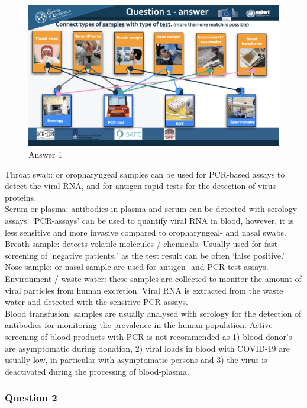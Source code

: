 \documentclass[
]{book}
\begin{document}
\begin{figure}
\centering
\includegraphics{images/m02/m02_questions_v2.003.jpeg}
\caption{Answer 1}
\end{figure}

Throat swab: or oropharyngeal samples can be used for PCR-based assays to detect the viral RNA, and for antigen rapid tests for the detection of virus-proteins.\\
Serum or plasma: antibodies in plasma and serum can be detected with serology assays. `PCR-assays' can be used to quantify viral RNA in blood, however, it is less sensitive and more invasive compared to oropharyngeal- and nasal swabs.\\
Breath sample: detects volatile molecules / chemicals. Usually used for fast screening of `negative patients,' as the test result can be often `false positive.'\\
Nose sample: or nasal sample are used for antigen- and PCR-test assays.\\
Environment / waste water: these samples are collected to monitor the amount of viral particles from human excretion. Viral RNA is extracted from the waste water and detected with the sensitive PCR-assays.\\
Blood transfusion: samples are usually analysed with serology for the detection of antibodies for monitoring the prevalence in the human population. Active screening of blood products with PCR is not recommended as 1) blood donor's are asymptomatic during donation, 2) viral loads in blood with COVID-19 are usually low, in particular with asymptomatic persons and 3) the virus is deactivated during the processing of blood-plasma.

\hypertarget{question-2}{%
\subsubsection{Question 2}\label{question-2}}
\end{document}

